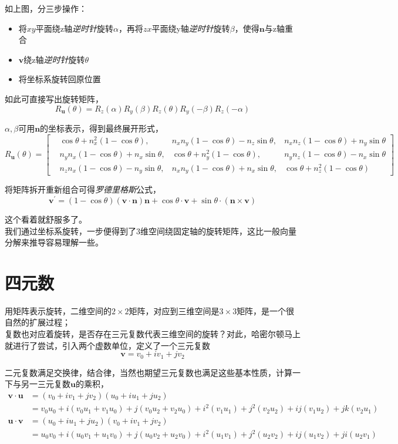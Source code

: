 \documentclass[hpyerref,UTF8,a4paper,titlepage,12pt,oneside]{ctexbook}
\theoremstyle{definition}
\begin{document}
如上图，分三步操作：
\begin{itemize}
	\item 将$xy$平面绕z轴\textit{逆时针}旋转$\alpha$，再将$zx$平面绕y轴\textit{逆时针}旋转$\beta$，使得$\mathbf{n}$与z轴重合
	\item $\mathbf{v}$绕z轴\textit{逆时针}旋转$\theta$
	\item 将坐标系旋转回原位置
\end{itemize}

如此可直接写出旋转矩阵，
$$
	R_{\mathbf{u}}(\theta) = R_z(\alpha)R_y(\beta)R_z(\theta)R_y(-\beta)R_z(-\alpha)
$$

$\alpha,\beta$可用$\mathbf{n}$的坐标表示，得到最终展开形式，
$$
	R_{\mathbf{u}}(\theta) = \begin{bmatrix}
	&\cos \theta +n_x^2(1-\cos\theta), &n_xn_y(1-\cos\theta)-n_z\sin\theta,&n_xn_z(1-\cos\theta) +n_y\sin\theta\\
	&n_yn_x(1-\cos\theta) + n_x\sin\theta, &\cos\theta + n_y^2(1-\cos\theta),&n_yn_z(1-\cos\theta) - n_x\sin\theta\\
	&n_zn_x(1-\cos\theta) -n_y\sin\theta, &n_xn_y(1-\cos\theta) +n_x\sin\theta,&\cos\theta+n_z^2(1-\cos\theta)
	\end{bmatrix}
$$

将矩阵拆开重新组合可得\textit{罗德里格斯}公式，
$$
	\mathbf{v}^\prime = (1-\cos\theta)(\mathbf{v}\cdot\mathbf{n})\mathbf{n} + \cos\theta\cdot\mathbf{v} + \sin\theta\cdot(\mathbf{n}\times \mathbf{v})
$$

这个看着就舒服多了。\\

我们通过坐标系旋转，一步便得到了3维空间绕固定轴的旋转矩阵，这比一般向量分解来推导容易理解一些。

\section{四元数}
用矩阵表示旋转，二维空间的$2\times 2$矩阵，对应到三维空间是$3\times 3$矩阵，是一个很自然的扩展过程；\\

复数也对应着旋转，是否存在三元复数代表三维空间的旋转？对此，哈密尔顿马上就进行了尝试，引入两个虚数单位，定义了一个三元复数
$$
	\mathbf{v} = v_0 + iv_1 +jv_2
$$

二元复数满足交换律，结合律，当然也期望三元复数也满足这些基本性质，计算一下与另一三元复数$\mathbf{u}$的乘积，
\begin{align*}
	\mathbf{v}\cdot\mathbf{u} 
		&= (v_0 + iv_1 +jv_2)(u_0 + iu_1 +ju_2) \\
		&= v_0u_0 + i(v_0u_1 + v_1u_0) +j(v_0u_2 +v_2u_0) +i^2(v_1u_1) +j^2(v_2u_2) + ij(v_1u_2) + jk(v_2u_1)\\
	\mathbf{u}\cdot\mathbf{v}
		&= (u_0 + iu_1 +ju_2) (v_0 + iv_1 +jv_2)\\
		&= u_0v_0 + i(u_0v_1 + u_1v_0) + j(u_0v_2 + u_2v_0) + i^2(u_1v_1) +j^2(u_2v_2) +ij(u_1v_2) + ji(u_2v_1)
\end{align*}
\end{document}
